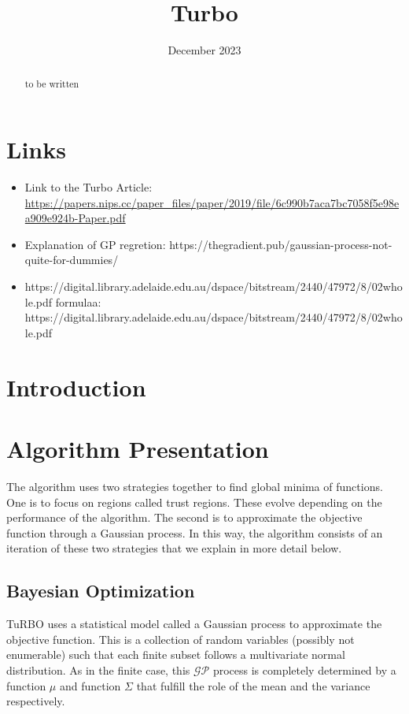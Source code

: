 \documentclass{article}
\title{Turbo}
\author{}
\date{December 2023}
\begin{document}
\maketitle

\section{Links}
\begin{itemize}
    \item Link to the Turbo Article: \url{https://papers.nips.cc/paper_files/paper/2019/file/6c990b7aca7bc7058f5e98ea909e924b-Paper.pdf}
    \item Explanation of GP regretion: https://thegradient.pub/gaussian-process-not-quite-for-dummies/
    \item https://digital.library.adelaide.edu.au/dspace/bitstream/2440/47972/8/02whole.pdf formulaa: https://digital.library.adelaide.edu.au/dspace/bitstream/2440/47972/8/02whole.pdf
    
\end{itemize}

\begin{abstract}
to be written
\end{abstract}

\section{Introduction}



\section{Algorithm Presentation}

The algorithm uses two strategies together to find global minima of functions. One is to focus on regions called trust regions. These evolve depending on the performance of the algorithm. The second is to approximate the objective function through a Gaussian process. In this way, the algorithm consists of an iteration of these two strategies that we explain in more detail below.


\subsection{Bayesian Optimization}

TuRBO uses a statistical model called a Gaussian process to approximate the objective function. This is a collection of random variables (possibly not enumerable) such that each finite subset follows a multivariate normal distribution. As in the finite case, this $\mathcal{GP}$ process is completely determined by a function $\mu$ and function $\Sigma$ that fulfill the role of the mean and the variance respectively.
\end{document}
